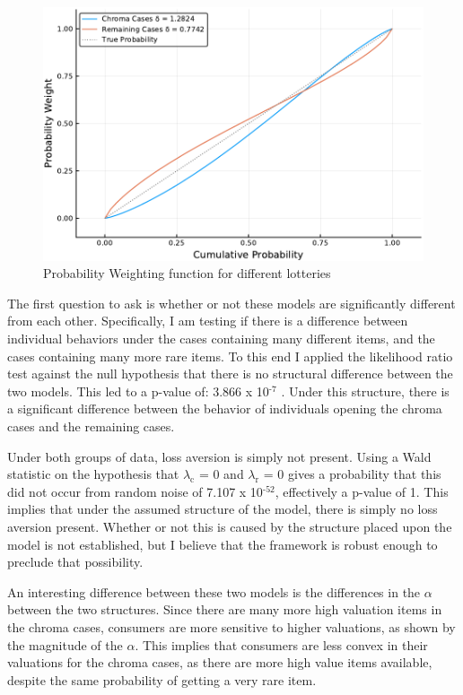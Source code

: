 \documentclass[12pt, letterpaper]{paper}
\begin{document}
\begin{figure}[htb]
\centering
\includegraphics[width=.9\linewidth]{../Scripts/ProbWeightDual.pdf}
\caption{\label{fig:double-prob}Probability Weighting function for different lotteries}
\end{figure}

The first question to ask is whether or not these models are
significantly different from each other. Specifically, I am testing if
there is a difference between individual behaviors under the cases
containing many different items, and the cases containing many more
rare items. To this end I applied the likelihood ratio test against
the null hypothesis that there is no structural difference between the
two models. This led to a p-value of: 3.866 x 10$^{\text{-7}}$ . Under this
structure, there is a significant difference between the behavior of
individuals opening the chroma cases and the remaining cases.

Under both groups of data, loss aversion is simply not present. Using
a Wald statistic on the hypothesis that $\lambda$$_{\text{c}}$ = 0 and $\lambda$$_{\text{r}}$ = 0 gives a
probability that this did not occur from random noise of
7.107 x 10$^{\text{-52}}$, effectively a p-value of 1. This implies that
under the assumed structure of the model, there is simply no loss
aversion present. Whether or not this is caused by the structure
placed upon the model is not established, but I believe that the
framework is robust enough to preclude that possibility.

An interesting difference between these two models is the differences
in the $\alpha$ between the two structures. Since there are many more high
valuation items in the chroma cases, consumers are more sensitive to
higher valuations, as shown by the magnitude of the $\alpha$. This implies
that consumers are less convex in their valuations for the chroma
cases, as there are more high value items available, despite the same
probability of getting a very rare item.
\end{document}
